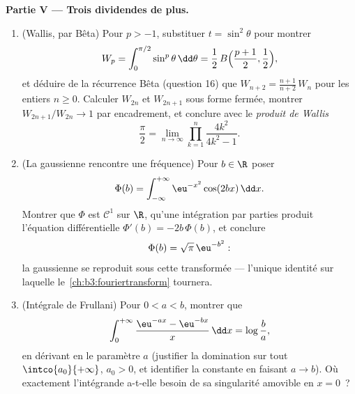 \begin{problem}
\medskip
\noindent\textbf{Partie V --- Trois dividendes de plus.}
\begin{enumerate}[resume]
  \item (Wallis, par Bêta) Pour $p > -1$, substituer $t =
        \sin^2\theta$ pour montrer
        \[
        W_p = \int_0^{\pi/2}\sin^p\theta\,\dd\theta
        = \frac12\,B\Bigl(\frac{p+1}2, \frac12\Bigr),
        \]
        et déduire de la récurrence Bêta (question 16) que
        $W_{n+2} = \frac{n+1}{n+2}\,W_n$ pour les entiers
        $n \geq 0$. Calculer $W_{2n}$ et $W_{2n+1}$ sous
        forme fermée, montrer $W_{2n+1}/W_{2n} \to 1$ par
        encadrement, et conclure avec le \emph{produit de
        Wallis}
        \[
        \frac\pi2 = \lim_{n\to\infty}
        \prod_{k=1}^{n}\frac{4k^2}{4k^2 - 1} .
        \]
  \item (La gaussienne rencontre une fréquence) Pour $b \in
        \R$ poser
        \[
        \Phi(b) = \int_{-\infty}^{+\infty}
        \eu^{-x^2}\cos(2bx)\,\dd x .
        \]
        Montrer que $\Phi$ est $\mathcal C^1$ sur $\R$,
        qu'une intégration par parties produit l'équation
        différentielle $\Phi'(b) = -2b\,\Phi(b)$, et
        conclure
        \[
        \Phi(b) = \sqrt\pi\,\eu^{-b^2} :
        \]
        la gaussienne se reproduit sous cette
        transformée --- l'unique identité sur laquelle
        le~\cref{ch:b3:fouriertransform} tournera.
  \item (Intégrale de Frullani) Pour $0 < a < b$, montrer
        que
        \[
        \int_0^{+\infty}
        \frac{\eu^{-ax} - \eu^{-bx}}{x}\,\dd x
        = \log\frac ba ,
        \]
        en dérivant en le paramètre $a$ (justifier la
        domination sur tout $\intco{a_0}{+\infty}$, $a_0 >
        0$, et identifier la constante en faisant $a \to
        b$). Où exactement l'intégrande a-t-elle besoin de
        sa singularité amovible en $x = 0$~?
\end{enumerate}
\end{problem}
